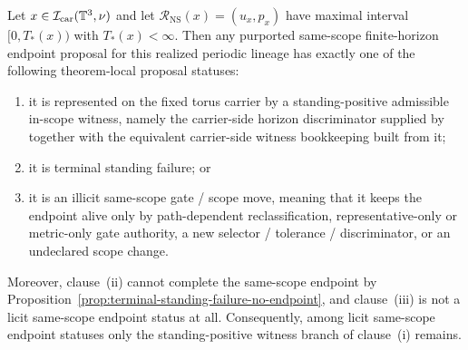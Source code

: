 \begin{manualtheorem}
\label{thm:same-scope-continuation-failure-dichotomy}
Let $x\in\mathcal I_{\mathrm{car}}(\mathbb{T}^3,\nu)$ and let $\mathcal R_{\mathrm{NS}}(x)=(u_x,p_x)$ have maximal interval $[0,T_*(x))$ with $T_*(x)<\infty$. Then any purported same-scope finite-horizon endpoint proposal for this realized periodic lineage has exactly one of the following theorem-local proposal statuses:
\begin{enumerate}[label=(\roman*), leftmargin=2.2em]
\item it is represented on the fixed torus carrier by a standing-positive admissible in-scope witness, namely the carrier-side horizon discriminator supplied by \HorizonDetectabilityRef{} together with the equivalent carrier-side witness bookkeeping built from it;
\item it is terminal standing failure; or
\item it is an illicit same-scope gate / scope move, meaning that it keeps the endpoint alive only by path-dependent reclassification, representative-only or metric-only gate authority, a new selector / tolerance / discriminator, or an undeclared scope change.
\end{enumerate}
Moreover, clause~(ii) cannot complete the same-scope endpoint by Proposition~\ref{prop:terminal-standing-failure-no-endpoint}, and clause~(iii) is not a licit same-scope endpoint status at all. Consequently, among licit same-scope endpoint statuses only the standing-positive witness branch of clause~(i) remains.
\end{manualtheorem}

